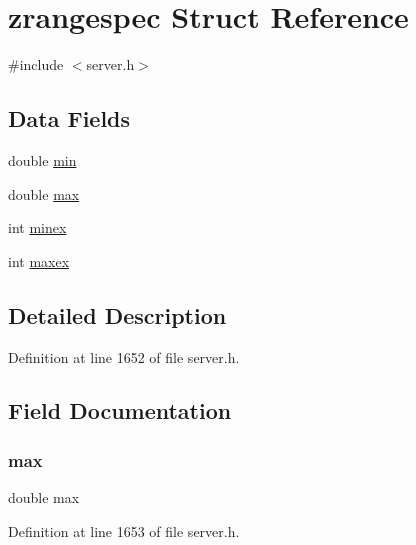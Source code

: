 \hypertarget{structzrangespec}{}\section{zrangespec Struct Reference}
\label{structzrangespec}


{\ttfamily \#include $<$server.\+h$>$}

\subsection*{Data Fields}
\begin{DoxyCompactItemize}
\item 
double \hyperlink{structzrangespec_aad36546e8175d2922bee165fe028fedc}{min}
\item 
double \hyperlink{structzrangespec_a0b0ede69e8156eb97acc579b88e883de}{max}
\item 
int \hyperlink{structzrangespec_a8e30ae1b8a7b7c514cb8bf62df65f4eb}{minex}
\item 
int \hyperlink{structzrangespec_a3d965e52da103eda2e33d871b0658cf3}{maxex}
\end{DoxyCompactItemize}


\subsection{Detailed Description}


Definition at line 1652 of file server.\+h.



\subsection{Field Documentation}
\mbox{\label{structzrangespec_a0b0ede69e8156eb97acc579b88e883de}} 
\subsubsection{\texorpdfstring{max}{max}}
{\footnotesize\ttfamily double max}



Definition at line 1653 of file server.\+h.

\mbox{\label{structzrangespec_a3d965e52da103eda2e33d871b0658cf3}} 
